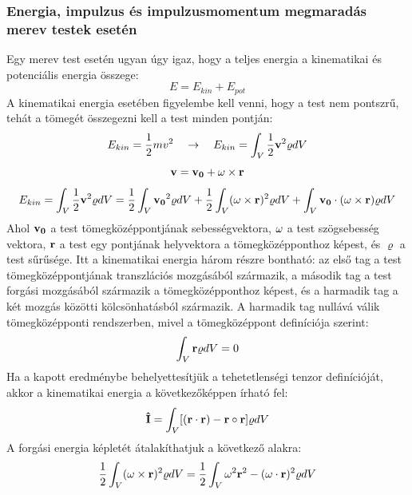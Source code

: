 \documentclass[../main.tex]{subfiles}
\begin{document}
\subsubsection{Energia, impulzus és impulzusmomentum megmaradás merev testek esetén}
Egy merev test esetén ugyan úgy igaz, hogy a teljes energia a kinematikai és potenciális energia összege:
\begin{equation}
    E = E_{kin} + E_{pot}
\end{equation}
A kinematikai energia esetében figyelembe kell venni, hogy a test nem pontszrű, tehát a tömegét összegezni kell a test minden pontján:
\begin{equation}
    E_{kin} = \frac{1}{2} m v^2 \quad \rightarrow \quad E_{kin} = \int_{V} \frac{1}{2} \bold{v}^2 \varrho dV
\end{equation}
\begin{equation}
    \bold{v} = \bold{v_0} + \bold{\omega} \times \bold{r}
\end{equation}
\begin{equation}
    E_{kin} = \int_{V} \frac{1}{2} \bold{v}^2 \varrho dV = \frac{1}{2} \int_{V} \bold{v_0}^2 \varrho dV + \frac{1}{2} \int_{V} (\bold{\omega} \times \bold{r})^2 \varrho dV + \int_{V} \bold{v_0} \cdot (\bold{\omega} \times \bold{r}) \varrho dV
\end{equation}
Ahol $\bold{v_0}$ a test tömegközéppontjának sebességvektora, $\bold{\omega}$ a test szögsebesség vektora, $\bold{r}$ a test egy pontjának helyvektora a tömegközépponthoz képest, és $\varrho$ a test sűrűsége.
Itt a kinematikai energia három részre bontható: az első tag a test tömegközéppontjának transzlációs mozgásából származik, a második tag a test forgási mozgásából származik a tömegközépponthoz képest, és a harmadik tag a két mozgás közötti kölcsönhatásból származik.
A harmadik tag nullává válik tömegközépponti rendszerben, mivel a tömegközéppont definíciója szerint:
\begin{equation}
    \int_{V} \bold{r} \varrho dV = 0
\end{equation}
Ha a kapott eredménybe behelyettesítjük a tehetetlenségi tenzor definícióját, akkor a kinematikai energia a következőképpen írható fel:
\begin{equation}
    \bold{\hat{I}} = \int_{V} [(\bold{r} \cdot \bold{r}) - \bold{r} \circ \bold{r}] \varrho dV
\end{equation}
A forgási energia képletét átalakíthatjuk a következő alakra:
\begin{equation}
    \frac{1}{2} \int_{V} (\bold{\omega} \times \bold{r})^2 \varrho dV = \frac{1}{2} \int_{V} \omega^2 \bold{r}^2 - (\bold{\omega} \cdot \bold{r})^2 \varrho dV
\end{equation}
\end{document}

